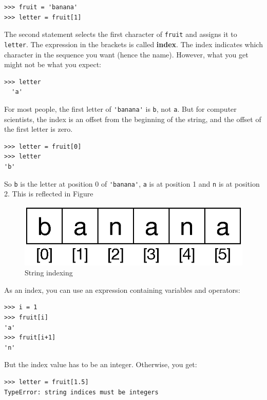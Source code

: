 \begin{Verbatim}[frame=single]
>>> fruit = 'banana'
>>> letter = fruit[1]
\end{Verbatim}
%
The second statement selects the first character of \texttt{fruit} and assigns it to \texttt{letter}.
%
The expression in the brackets is called \textbf{index}.
The index indicates which character in the sequence you want (hence the name).
%
However, what you get might not be what you expect:

\begin{Verbatim}[frame=single]
>>> letter
  'a'
\end{Verbatim}
%
For most people, the first letter of \verb"'banana'" is \texttt{b}, not \texttt{a}. But for computer scientists, the index is an offset from the beginning of the string, and the offset of the first letter is zero.

\begin{Verbatim}[frame=single]
>>> letter = fruit[0]
>>> letter
'b'
\end{Verbatim}
%
So \texttt{b} is the letter at position 0 of \verb"'banana'", \texttt{a} is at position 1 and \texttt{n} is at position 2. This is reflected in Figure

\begin{figure}[h]
    \centering
    \includegraphics{images/string.eps}
    \caption{String indexing}
    \label{fig:fruta}
\end{figure}



As an index, you can use an expression containing variables and operators:

\begin{Verbatim}[frame=single]
>>> i = 1
>>> fruit[i]
'a'
>>> fruit[i+1]
'n'
\end{Verbatim}
%

But the index value has to be an integer. Otherwise, you get:

\begin{Verbatim}[frame=single]
>>> letter = fruit[1.5]
TypeError: string indices must be integers
\end{Verbatim}
%

